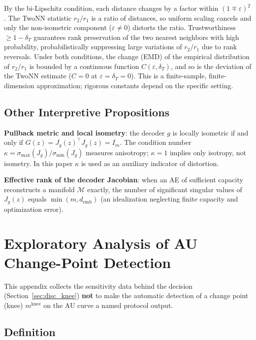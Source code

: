 \documentclass[make,article,submit,pdftex,moreauthors]{Definitions/mdpi}
\newcommand{\Jg}{J_g}
\newcommand{\kap}{\kappa}
\newcommand{\demb}{d_{\mathrm{emb}}}
\newcommand{\mknee}{m^{\mathrm{knee}}}
\begin{document}
By the bi-Lipschitz condition, each distance changes by a factor within
$(1 \mp \varepsilon)^2$.
The TwoNN statistic $r_2/r_1$ is a ratio of distances, so uniform scaling
cancels and only the non-isometric component ($\varepsilon \neq 0$) distorts
the ratio.
Trustworthiness $\geq 1 - \delta_T$ guarantees rank preservation of the two
nearest neighbors with high probability, probabilistically suppressing large
variations of $r_2/r_1$ due to rank reversals.
Under both conditions, the change (EMD) of the empirical distribution of
$r_2/r_1$ is bounded by a continuous function $C(\varepsilon, \delta_T)$,
and so is the deviation of the TwoNN estimate
($C = 0$ at $\varepsilon = \delta_T = 0$).
This is a finite-sample, finite-dimension approximation; rigorous constants
depend on the specific setting.

\subsection[\appendixname~\thesubsection]{Other Interpretive Propositions}

\textbf{Pullback metric and local isometry}:
the decoder $g$ is locally isometric if and only if
$G(z) = \Jg(z)^\top \Jg(z) = I_m$.
The condition number $\kap = \sigma_{\max}(\Jg)/\sigma_{\min}(\Jg)$ measures
anisotropy; $\kap = 1$ implies only isotropy, not isometry.
In this paper $\kap$ is used as an auxiliary indicator of distortion.

\textbf{Effective rank of the decoder Jacobian}:
when an AE of sufficient capacity reconstructs a manifold $\mathcal{M}$
exactly, the number of significant singular values of $\Jg(z)$ equals
$\min(m, \demb)$ (an idealization neglecting finite capacity and
optimization error).

\section[\appendixname~\thesection]{Exploratory Analysis of AU Change-Point Detection}\label{app:knee}

This appendix collects the sensitivity data behind the decision
(Section~\ref{sec:disc_knee}) \textbf{not} to make the automatic detection
of a change point (knee) $\mknee$ on the AU curve a named protocol output.

\subsection[\appendixname~\thesubsection]{Definition}
\end{document}

